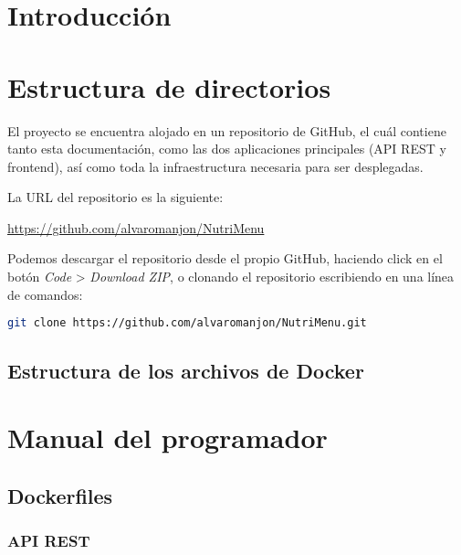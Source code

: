 
\section{Introducción}

\section{Estructura de directorios}

El proyecto se encuentra alojado en un repositorio de GitHub, el cuál contiene tanto esta documentación, como las dos aplicaciones principales (API REST y frontend), así como toda la infraestructura necesaria para ser desplegadas. 

La URL del repositorio es la siguiente:

\href{https://github.com/alvaromanjon/NutriMenu}{https://github.com/alvaromanjon/NutriMenu}


Podemos descargar el repositorio desde el propio GitHub, haciendo click en el botón \textit{Code} > \textit{Download ZIP}, o clonando el repositorio escribiendo en una línea de comandos:

\begin{lstlisting}[language=Bash]
  git clone https://github.com/alvaromanjon/NutriMenu.git
\end{lstlisting}

\subsection{Estructura de los archivos de Docker}


\section{Manual del programador}

\subsection{Dockerfiles}

\subsubsection{API REST}


